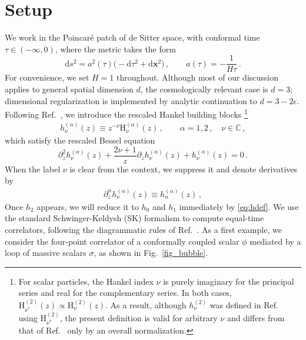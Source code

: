 \documentclass[%
 reprint,
 amsmath,amssymb,
 aps,
prd,
]{revtex4-2}
\def\di{{\mathrm{d}}}
\def\ep{\epsilon}
\begin{document}

\section{Setup}
\label{sec:definitions}

We work in the Poincar\'e patch of de Sitter space, with conformal time \(\tau\in(-\infty,0)\), where the metric takes the form
\begin{equation}
\di s^2=a^2(\tau)\bigl(-\di\tau^2+\di\bm x^2\bigr)\,,\qquad
a(\tau)=-\frac{1}{H\tau}\,.
\end{equation}
For convenience, we set \(H=1\) throughout. Although most of our discussion applies to general spatial dimension \(d\), the cosmologically relevant case is \(d=3\); dimensional regularization is implemented by analytic continuation to \(d=3-2\ep\).
Following Ref.~\cite{Chen:2023iix}, we introduce the rescaled Hankel building blocks \footnote{For scalar particles, the Hankel index \(\nu\) is purely imaginary for the principal series and real for the complementary series. In both cases, \(\mathrm H_{\nu^*}^{(2)}(z)\propto \mathrm H_\nu^{(2)}(z)\). As a result, although \(h_\nu^{(2)}\) was defined in Ref.~\cite{Chen:2023iix} using \(\mathrm H_{\nu^*}^{(2)}\), the present definition is valid for arbitrary \(\nu\) and differs from that of Ref.~\cite{Chen:2023iix} only by an overall normalization.}
\begin{align}
h_\nu^{(\alpha)}(z) \equiv z^{-\nu}\mathrm H_\nu^{(\alpha)}(z)\,,\qquad \alpha=1,2\,,\quad
\nu\in\mathbb C\,,
\label{eq:h}
\end{align}
which satisfy the rescaled Bessel equation
\begin{equation}
\partial_z^2 h_\nu^{(\alpha)}(z)+\frac{2\nu+1}{z}\partial_z h_\nu^{(\alpha)}(z)+h_\nu^{(\alpha)}(z)=0\,.
\label{eq:hdef}
\end{equation}
When the label \(\nu\) is clear from the context, we suppress it and denote derivatives by
\begin{align}
\partial_z^n h_\nu^{(\alpha)}(z)\equiv h_n^{(\alpha)}(z)\,,
\end{align}
Once $h_2$ appears, we will reduce it to $h_0$ and $h_1$ immediately by \eqref{eq:hdef}.
We use the standard Schwinger-Keldysh (SK) formalism \cite{Schwinger:1960qe,Feynman:1963fq,Keldysh:1964ud,Weinberg:2005vy} to compute equal-time correlators, following the diagrammatic rules of Ref.~\cite{Chen:2017ryl}. As a first example, we consider the four-point correlator of a conformally coupled scalar \(\phi\) mediated by a loop of massive scalars \(\sigma\), as shown in Fig.~\ref{fig_bubble}.
\end{document}
